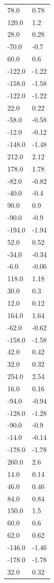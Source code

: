 \begin{longtable}{ll}
78.0 & 0.78 \\
120.0 & 1.2 \\
28.0 & 0.28 \\
-70.0 & -0.7 \\
60.0 & 0.6 \\
-122.0 & -1.22 \\
-158.0 & -1.58 \\
-122.0 & -1.22 \\
22.0 & 0.22 \\
-58.0 & -0.58 \\
-12.0 & -0.12 \\
-148.0 & -1.48 \\
212.0 & 2.12 \\
178.0 & 1.78 \\
-82.0 & -0.82 \\
-40.0 & -0.4 \\
90.0 & 0.9 \\
-90.0 & -0.9 \\
-194.0 & -1.94 \\
52.0 & 0.52 \\
-34.0 & -0.34 \\
-6.0 & -0.06 \\
118.0 & 1.18 \\
30.0 & 0.3 \\
12.0 & 0.12 \\
164.0 & 1.64 \\
-62.0 & -0.62 \\
-158.0 & -1.58 \\
42.0 & 0.42 \\
32.0 & 0.32 \\
254.0 & 2.54 \\
16.0 & 0.16 \\
-94.0 & -0.94 \\
-128.0 & -1.28 \\
-90.0 & -0.9 \\
-14.0 & -0.14 \\
-178.0 & -1.78 \\
260.0 & 2.6 \\
14.0 & 0.14 \\
46.0 & 0.46 \\
84.0 & 0.84 \\
150.0 & 1.5 \\
60.0 & 0.6 \\
62.0 & 0.62 \\
-146.0 & -1.46 \\
-178.0 & -1.78 \\
32.0 & 0.32 \\

\end{longtable}
